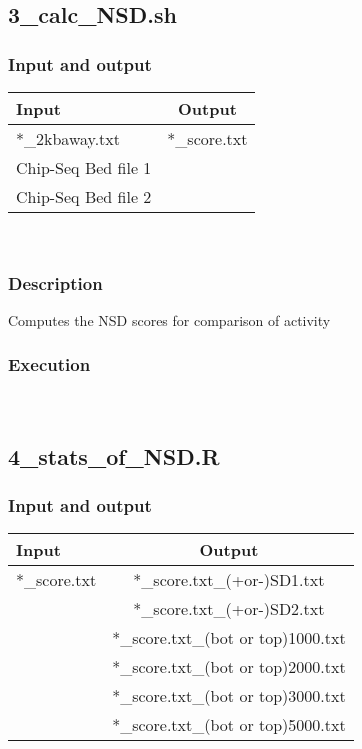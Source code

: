 \documentclass[14pt]{article}
\begin{document}
\subsection{3\_calc\_NSD.sh}
\subsubsection{Input and output}
\begin{tabular}{l |c }
Input & Output \\
\hline
*\_2kbaway.txt & *\_score.txt\\
Chip-Seq Bed file 1\\ 
Chip-Seq Bed file 2\\

\end{tabular}\\
\subsubsection{Description}
Computes the NSD scores for comparison of activity\\
\subsubsection{Execution}
\\



\subsection{4\_stats\_of\_NSD.R}
\subsubsection{Input and output}
\begin{tabular}{l |c }
Input & Output \\
\hline
*\_score.txt&*\_score.txt\_(+or-)SD1.txt \\
&*\_score.txt\_(+or-)SD2.txt\\
&*\_score.txt\_(bot or top)1000.txt\\
&*\_score.txt\_(bot or top)2000.txt\\
&*\_score.txt\_(bot or top)3000.txt\\
&*\_score.txt\_(bot or top)5000.txt\\


\end{tabular}\\
\end{document}

